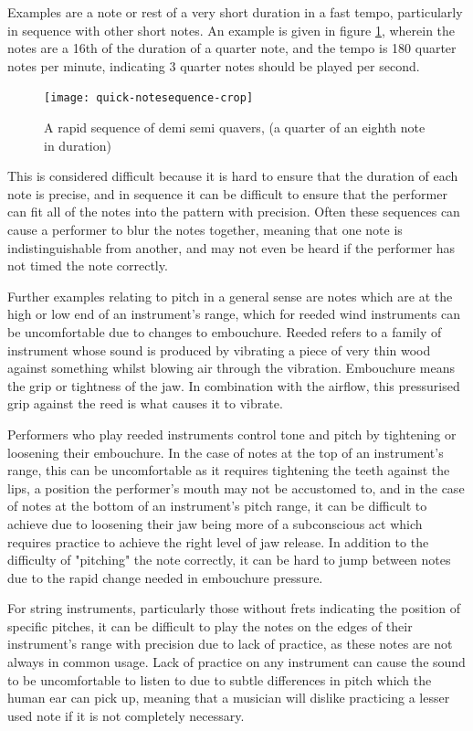 Examples are a note or rest of a very short duration in a fast tempo, particularly in sequence with other short notes. An example is given in figure \ref{fig:notesequence}, wherein the notes are a 16th of the duration of a quarter note, and the tempo is 180 quarter notes per minute, indicating 3 quarter notes should be played per second.

\begin{figure}[H]
\centering
\texttt{[image: quick-notesequence-crop]}
\caption{A rapid sequence of demi semi quavers, (a quarter of an eighth note in duration)}
\label{fig:notesequence}	
\end{figure}

 This is considered difficult because it is hard to ensure that the duration of each note is precise, and in sequence it can be difficult to ensure that the performer can fit all of the notes into the pattern with precision. Often these sequences can cause a performer to blur the notes together, meaning that one note is indistinguishable from another, and may not even be heard if the performer has not timed the note correctly.

Further examples relating to pitch in a general sense are notes which are at the high or low end of an instrument's range, which for reeded wind instruments can be uncomfortable due to changes to embouchure. Reeded refers to a family of instrument whose sound is produced by vibrating a piece of very thin wood against something whilst blowing air through the vibration. Embouchure means the grip or tightness of the jaw. In combination with the airflow, this pressurised grip against the reed is what causes it to vibrate.

Performers who play reeded instruments control tone and pitch by tightening or loosening their embouchure. In the case of notes at the top of an instrument's range, this can be uncomfortable as it requires tightening the teeth against the lips, a position the performer's mouth may not be accustomed to, and in the case of notes at the bottom of an instrument's pitch range, it can be difficult to achieve due to loosening their jaw being more of a subconscious act which requires practice to achieve the right level of jaw release. In addition to the difficulty of "pitching" the note correctly, it can be hard to jump between notes due to the rapid change needed in embouchure pressure.

For string instruments, particularly those without frets indicating the position of specific pitches, it can be difficult to play the notes on the edges of their instrument's range with precision due to lack of practice, as these notes are not always in common usage. Lack of practice on any instrument can cause the sound to be uncomfortable to listen to due to subtle differences in pitch which the human ear can pick up, meaning that a musician will dislike practicing a lesser used note if it is not completely necessary.

